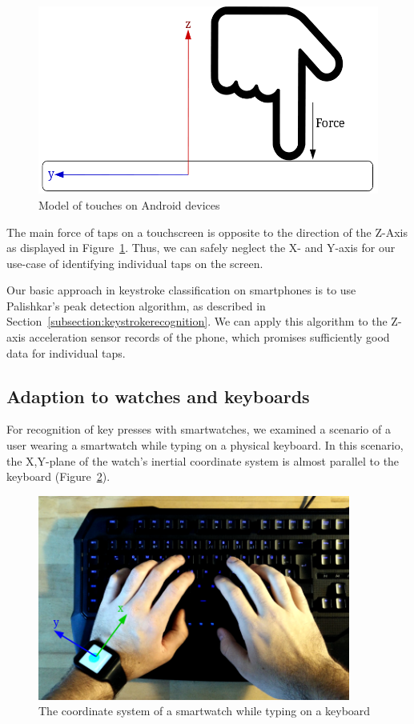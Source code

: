 \begin{figure}
    \centering
    \includegraphics[width=\textwidth]{figures/TapDirection.png}
    \caption{Model of touches on Android devices}
    \label{fig:touchdirection}
\end{figure}
The main force of taps on a touchscreen is opposite to the direction of the Z-Axis as displayed in Figure~\ref{fig:touchdirection}. Thus, we can safely neglect the X- and Y-axis for our use-case of identifying individual taps on the screen.

Our basic approach in keystroke classification on smartphones is to use Palishkar's peak detection algorithm, as described in Section~\ref{subsection:keystrokerecognition}. We can apply this algorithm to the Z-axis acceleration sensor records of the phone, which promises sufficiently good data for individual taps.

\subsection{Adaption to watches and keyboards}
For recognition of key presses with smartwatches, we examined a scenario of a user wearing a smartwatch while typing on a physical keyboard. In this scenario, the X,Y-plane of the watch's inertial coordinate system is almost parallel to the keyboard (\cf Figure~\ref{fig:watchcoordinate}).

\begin{figure}
    \centering
    \includegraphics[width=0.9147\textwidth]{figures/WatchCoordinateSystem.png}
    \caption{The coordinate system of a smartwatch while typing on a keyboard}
    \label{fig:watchcoordinate}
\end{figure}

